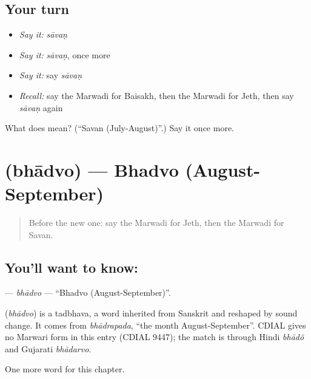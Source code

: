 \subsection*{Your turn}
\begin{itemize}
\raggedright
  \item \emph{Say it:} \emph{sāvaṇ}
  \item \emph{Say it:} \emph{sāvaṇ}, once more
  \item \emph{Say it:} say \emph{sāvaṇ}
  \item \emph{Recall:} say the Marwadi for Baisakh, then the Marwadi for Jeth, then say \emph{sāvaṇ} again
\end{itemize}

\begin{tcolorbox}[breakable,colback=teal!4,colframe=teal!35!black,title={Before you move on}]
What does  mean? (\textquotedblleft{}Savan (July-August)\textquotedblright{}.) Say it once more.
\end{tcolorbox}
\section[\texorpdfstring{\mw{भादवो} (bhādvo)}{भादवो (bhādvo)}]{ (bhādvo) — Bhadvo (August-September)}

\label{lesson:MW-C93-bhadvo}



\begin{quote}
Before the new one: say the Marwadi for Jeth, then the Marwadi for Savan.
\end{quote}

\subsection*{You'll want to know: }
\textbf{} — \emph{bhādvo} — \textquotedblleft{}Bhadvo (August-September)\textquotedblright{}.

\begin{cousinweb}
\textbf{} (\emph{bhādvo}) is a tadbhava, a word inherited from Sanskrit and reshaped by sound change. It comes from \emph{bhādrapada}, \textquotedblleft{}the month August-September\textquotedblright{}. CDIAL gives no Marwari form in this entry (CDIAL 9447); the match is through Hindi \emph{bhādõ} and Gujarati \emph{bhādarvo}.
\end{cousinweb}

\begin{grammarlens}[title={What you've built}]
One more word for this chapter.
\end{grammarlens}

